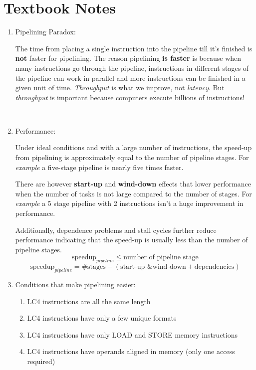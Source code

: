 \documentclass[12pt]{article}
\newenvironment{QandA}{\begin{enumerate}[label=\bfseries\arabic*.]\bfseries}
                      {\end{enumerate}}
\newenvironment{answered}{\par\quad\normalfont}{}
\begin{document}
\section{Textbook Notes}
\begin{QandA}
   \item Pipelining Paradox:
   \begin{answered}
    The time from placing a single instruction into the pipeline till it's finished is \textbf{not} faster for pipelining. The reason pipelining \textbf{is faster} is because when many instructions go through the pipeline, instructions in different stages of the pipeline can work in parallel and more instructions can be finished in a given unit of time. \textit{Throughput} is what we improve, not \textit{latency}. But \textit{throughput} is important because computers execute billions of instructions!
   \end{answered}
   
   \ 
   
   \item Performance:
   \begin{answered}
   Under ideal conditions and with a large number of instructions, the speed-up from pipelining is approximately equal to the number of pipeline stages. For \textit{example} a five-stage pipeline is nearly five times faster. 
   
   There are however \textbf{start-up} and \textbf{wind-down} effects that lower performance when the number of tasks is not large compared to the number of stages. For \textit{example} a 5 stage pipeline with 2 instructions isn't a huge improvement in performance. 
   
   Additionally, dependence problems and stall cycles further reduce performance indicating that the speed-up is usually less than the number of pipeline stages.
   \begin{equation*}
       \text{speedup}_{pipeline} \leq \text{number of pipeline stage}
   \end{equation*}
      \begin{equation*}
       \text{speedup}_{pipeline} = \text{\#stages} - (\text{start-up \& wind-down} + \text{dependencies})
   \end{equation*}
   \end{answered}
   
   \item Conditions that make pipelining easier:
   \begin{answered}
   \vspace{-0.85cm}
   \begin{enumerate}
       \item LC4 instructions are all the same length
       \item LC4 instructions have only a few unique formats
       \item LC4 instructions have only LOAD and STORE memory instructions
       \item LC4 instructions have operands aligned in memory (only one access required)
   \end{enumerate}
   \end{answered}
   

\end{QandA}
\end{document}
